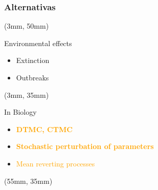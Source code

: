 \begin{frame}
    \frametitle{Alternativas}
    \begin{textblock*}{37mm}(3mm, 50mm)
        \begin{block}{Environmental effects}
            \begin{itemize}
                \item Extinction
                \item Outbreaks
            \end{itemize}
        \end{block}
    \end{textblock*}
    \begin{textblock*}{37mm}(3mm, 35mm)
        \begin{block}{In Biology}
            \begin{itemize}
                \item<1> \textcolor<1>{orange}{\textbf{DTMC, CTMC}}
                \item<2-3>\textcolor<2-3>{orange}{
                    \textbf<2-3>{%
                        Stochastic perturbation of parameters
                    }
                }
                \item<4> \textcolor<4>{orange}{Mean reverting processes}
            \end{itemize}
        \end{block}
    \end{textblock*}
    \begin{textblock*}{65mm}(55mm, 35mm)
        \begin{alertblock}{%
            }%
\end{alertblock}
\end{textblock*}
\end{frame}
